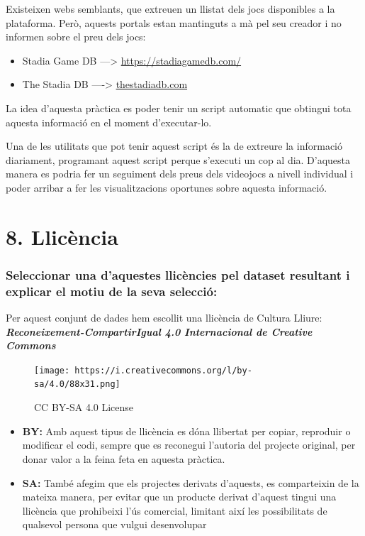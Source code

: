 \documentclass[]{article}
\providecommand{\tightlist}{%
  \setlength{\itemsep}{0pt}\setlength{\parskip}{0pt}}
\begin{document}
Existeixen webs semblants, que extreuen un llistat dels jocs disponibles
a la plataforma. Però, aquests portals estan mantinguts a mà pel seu
creador i no informen sobre el preu dels jocs:

\begin{itemize}
\tightlist
\item
  Stadia Game DB ---\textgreater{} \url{https://stadiagamedb.com/}
\item
  The Stadia DB ----\textgreater{} \url{thestadiadb.com}
\end{itemize}

La idea d'aquesta pràctica es poder tenir un script automatic que
obtingui tota aquesta informació en el moment d'executar-lo.

Una de les utilitats que pot tenir aquest script és la de extreure la
informació diariament, programant aquest script perque s'executi un cop
al dia. D'aquesta manera es podria fer un seguiment dels preus dels
videojocs a nivell individual i poder arribar a fer les visualitzacions
oportunes sobre aquesta informació.

\hypertarget{llicuxe8ncia}{%
\section{8. Llicència}\label{llicuxe8ncia}}

\hypertarget{seleccionar-una-daquestes-llicuxe8ncies-pel-dataset-resultant-i-explicar-el-motiu-de-la-seva-selecciuxf3}{%
\subsubsection{Seleccionar una d'aquestes llicències pel dataset
resultant i explicar el motiu de la seva
selecció:}\label{seleccionar-una-daquestes-llicuxe8ncies-pel-dataset-resultant-i-explicar-el-motiu-de-la-seva-selecciuxf3}}

Per aquest conjunt de dades hem escollit una llicència de Cultura
Lliure: \textbf{\emph{Reconeixement-CompartirIgual 4.0 Internacional de
Creative Commons}}

\begin{figure}
\centering
\texttt{[image: https://i.creativecommons.org/l/by-sa/4.0/88x31.png]}
\caption{CC BY-SA 4.0 License}
\end{figure}

\begin{itemize}
\tightlist
\item
  \textbf{BY:} Amb aquest tipus de llicència es dóna llibertat per
  copiar, reproduir o modificar el codi, sempre que es reconegui
  l'autoria del projecte original, per donar valor a la feina feta en
  aquesta pràctica.
\item
  \textbf{SA:} També afegim que els projectes derivats d'aquests, es
  comparteixin de la mateixa manera, per evitar que un producte derivat
  d'aquest tingui una llicència que prohibeixi l'ús comercial, limitant
  així les possibilitats de qualsevol persona que vulgui desenvolupar
\end{itemize}
\end{document}
